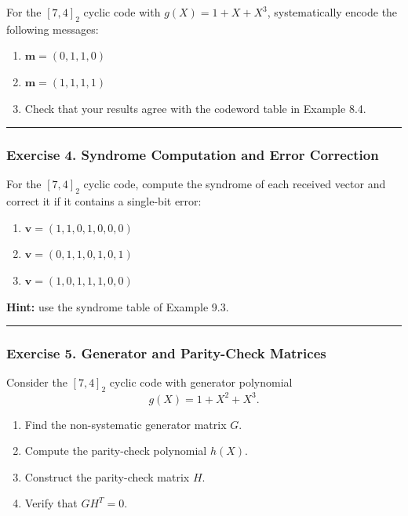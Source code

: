 \documentclass[
]{article}
\begin{document}
For the \([7,4]_2\) cyclic code with \(g(X)=1+X+X^3\), systematically
encode the following messages:

\begin{enumerate}
\def\labelenumi{(\alph{enumi})}
\item
  \(\mathbf{m}=(0,1,1,0)\)
\item
  \(\mathbf{m}=(1,1,1,1)\)
\item
  Check that your results agree with the codeword table in Example 8.4.
\end{enumerate}

\begin{center}\rule{0.5\linewidth}{0.5pt}\end{center}

\subsubsection{Exercise 4. Syndrome Computation and Error
Correction}\label{exercise-4.-syndrome-computation-and-error-correction}

For the \([7,4]_2\) cyclic code, compute the syndrome of each received
vector and correct it if it contains a single-bit error:

\begin{enumerate}
\def\labelenumi{(\alph{enumi})}
\item
  \(\mathbf{v}=(1,1,0,1,0,0,0)\)
\item
  \(\mathbf{v}=(0,1,1,0,1,0,1)\)
\item
  \(\mathbf{v}=(1,0,1,1,1,0,0)\)
\end{enumerate}

\textbf{Hint:} use the syndrome table of Example 9.3.

\begin{center}\rule{0.5\linewidth}{0.5pt}\end{center}

\subsubsection{Exercise 5. Generator and Parity-Check
Matrices}\label{exercise-5.-generator-and-parity-check-matrices}

Consider the \([7,4]_2\) cyclic code with generator polynomial
\[g(X)=1+X^2+X^3.\]

\begin{enumerate}
\def\labelenumi{(\alph{enumi})}
\item
  Find the non-systematic generator matrix \(G\).
\item
  Compute the parity-check polynomial \(h(X)\).
\item
  Construct the parity-check matrix \(H\).
\item
  Verify that \(GH^T=0\).
\end{enumerate}
\end{document}
